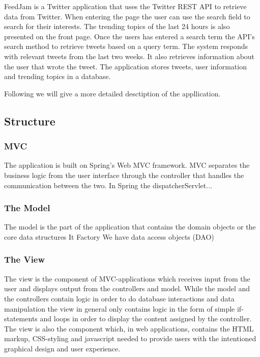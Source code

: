 FeedJam is a Twitter application that uses the Twitter REST API to retrieve data from Twitter. When entering the page the user can use the search field to search for their interests. The trending topics of the last 24 hours is also presented on the front page. Once the users has entered a search term the API's search method to retrieve tweets based on a query term. 
The system responds with relevant tweets from the last two weeks. It also retrieves information about the user that wrote the tweet. The application stores tweets, user information and trending topics in a database. 

Following we will give a more detailed desctiption of the appllication.

\subsection{Structure}

\subsubsection{MVC} %
The application is built on Spring's Web MVC framework. MVC separates the business logic from the user interface through the controller that handles the communication between the two. In Spring the dispatcherServlet...%


\subsubsection{The Model} %
The model is the part of the application that contains the domain objects or the core data structures \citep{}%
It 
Factory
We have data access objects (DAO) 
\subsubsection{The View}
The view is the component of MVC-applications which receives input from the user and displays output from the controllers and model. While the model and the controllers contain logic in order to do database interactions and data manipulation the view in general only contains logic in the form of simple if-statements and loops in order to display the content assigned by the controller. The view is also the component which, in web applications, contains the HTML markup, CSS-styling and javascript needed to provide users with the intentioned graphical design and user experience.

